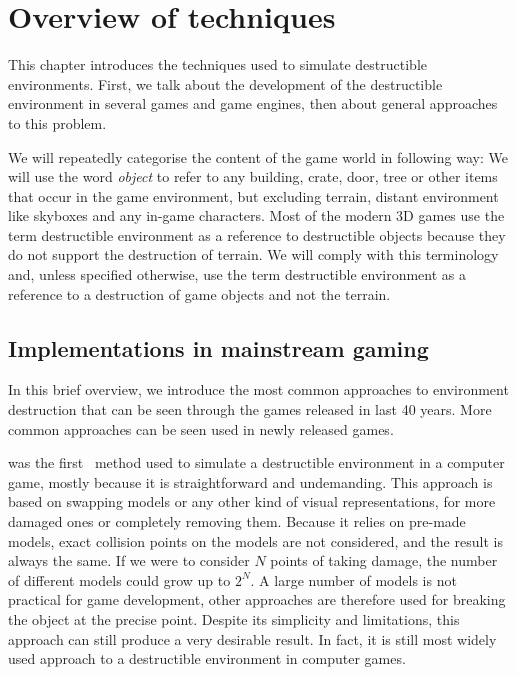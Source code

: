 \chapter{Overview of techniques}
This chapter introduces the techniques used to simulate destructible environments. First, we talk about the development of the destructible environment in several games and game engines, then about general approaches to this problem.

We will repeatedly categorise the content of the game world in following way: We will use the word \emph{object} to refer to any building, crate, door, tree or other items that occur in the game environment, but excluding terrain, distant environment like skyboxes and any in-game characters. Most of the modern 3D games use the term destructible environment as a reference to destructible objects because they do not support the destruction of terrain. We will comply with this terminology and, unless specified otherwise, use the term destructible environment as a reference to a destruction of game objects and not the terrain.

\section{Implementations in mainstream gaming}
\label{sec:common}
In this brief overview, we introduce the most common approaches to environment destruction that can be seen through the games released in last 40 years. More common approaches can be seen used in newly released games.

 was the first~\cite{history} method used to simulate a destructible environment in a computer game, mostly because it is straightforward and undemanding. This approach is based on swapping models or any other kind of visual representations, for more damaged ones or completely removing them. Because it relies on pre-made models, exact collision points on the models are not considered, and the result is always the same. If we were to consider $N$ points of taking damage, the number of different models could grow up to $2^N$. A large number of models is not practical for game development, other approaches are therefore used for breaking the object at the precise point. Despite its simplicity and limitations, this approach can still produce a very desirable result. In fact, it is still most widely used approach to a destructible environment in computer games.

